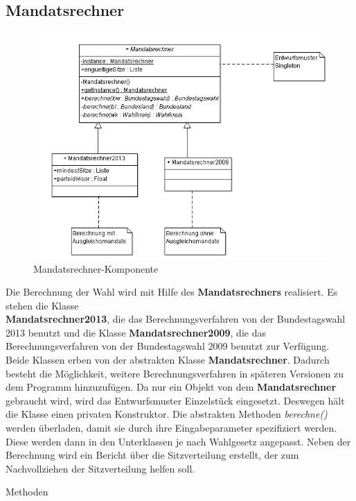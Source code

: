 \documentclass[12pt,a4paper,titlepage]{article}
\newcommand{\myma}{\fontfamily{pcr}\selectfont \textbf}
\newcommand{\mymo}{\fontfamily{pcr}\selectfont \textit}
\begin{document}
\subsection{Mandatsrechner}
\begin{figure}[!ht]
\centering
\includegraphics[scale=0.6]{Mandatsrechneralles.png} \caption{Mandatsrechner-Komponente} 
\end{figure}
Die Berechnung der Wahl wird mit Hilfe des {\myma{Mandatsrechners}} realisiert. Es stehen die Klasse \\{\myma{Mandatsrechner2013}}, die das Berechnungsverfahren von der Bundestagswahl 2013 benutzt und die Klasse {\myma{Mandatsrechner2009}}, die das Berechnungsverfahren von der Bundestagswahl 2009 benutzt zur Verfügung. Beide Klassen erben von der abstrakten Klasse {\myma{Mandatsrechner}}. Dadurch besteht die Möglichkeit, weitere Berechnungsverfahren in späteren Versionen zu dem Programm hinzuzufügen. Da nur ein Objekt von dem {\myma{Mandatsrechner}} gebraucht wird, wird das Entwurfsmuster Einzelstück eingesetzt. Deswegen hält die Klasse einen privaten Konstruktor. Die abstrakten Methoden {\mymo{berechne()}} werden überladen, damit sie durch ihre Eingabeparameter spezifiziert werden. Diese werden dann in den Unterklassen je nach Wahlgesetz angepasst. Neben der Berechnung wird ein Bericht über die Sitzverteilung erstellt, der zum Nachvollziehen der Sitzverteilung helfen soll.
\begin{large}
Methoden 
\end{large}
\end{document}
